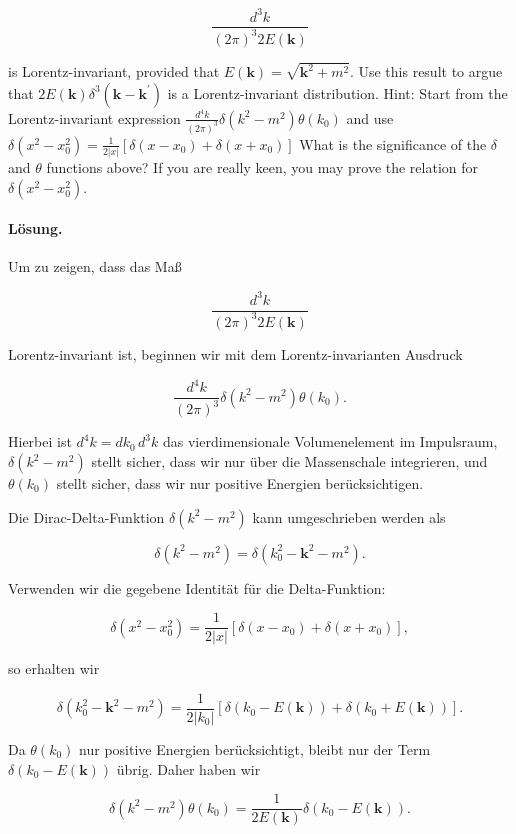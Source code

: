 \documentclass[11pt,a4paper]{article}
\begin{document}
$$
\frac{d^3 k}{(2 \pi)^3 2 E(\mathbf{k})}
$$

is Lorentz-invariant, provided that $E(\mathbf{k})=\sqrt{\mathbf{k}^2+m^2}$. Use this result to argue that $2 E(\mathbf{k}) \delta^3\left(\mathbf{k}-\mathbf{k}^{\prime}\right)$ is a Lorentz-invariant distribution.
Hint: Start from the Lorentz-invariant expression $\frac{d^4 k}{(2 \pi)^3} \delta\left(k^2-m^2\right) \theta\left(k_0\right)$ and use $\delta\left(x^2-x_0^2\right)=\frac{1}{2|x|}\left[\delta\left(x-x_0\right)+\delta\left(x+x_0\right)\right]$ What is the significance of the $\delta$ and $\theta$ functions above? If you are really keen, you may prove the relation for $\delta\left(x^2-x_0^2\right)$.

\paragraph{Lösung.}
Um zu zeigen, dass das Maß 

\[
\frac{d^3 k}{(2 \pi)^3 2 E(\mathbf{k})}
\]

Lorentz-invariant ist, beginnen wir mit dem Lorentz-invarianten Ausdruck 

\[
\frac{d^4 k}{(2 \pi)^3} \delta\left(k^2 - m^2\right) \theta\left(k_0\right).
\]

Hierbei ist $d^4 k = dk_0 \, d^3 k$ das vierdimensionale Volumenelement im Impulsraum, $\delta\left(k^2 - m^2\right)$ stellt sicher, dass wir nur über die Massenschale integrieren, und $\theta\left(k_0\right)$ stellt sicher, dass wir nur positive Energien berücksichtigen.

Die Dirac-Delta-Funktion $\delta\left(k^2 - m^2\right)$ kann umgeschrieben werden als 

\[
\delta\left(k^2 - m^2\right) = \delta\left(k_0^2 - \mathbf{k}^2 - m^2\right).
\]

Verwenden wir die gegebene Identität für die Delta-Funktion:

\[
\delta\left(x^2 - x_0^2\right) = \frac{1}{2|x|}\left[\delta\left(x - x_0\right) + \delta\left(x + x_0\right)\right],
\]

so erhalten wir

\[
\delta\left(k_0^2 - \mathbf{k}^2 - m^2\right) = \frac{1}{2|k_0|} \left[\delta\left(k_0 - E(\mathbf{k})\right) + \delta\left(k_0 + E(\mathbf{k})\right)\right].
\]

Da $\theta(k_0)$ nur positive Energien berücksichtigt, bleibt nur der Term $\delta\left(k_0 - E(\mathbf{k})\right)$ übrig. Daher haben wir

\[
\delta\left(k^2 - m^2\right) \theta\left(k_0\right) = \frac{1}{2E(\mathbf{k})} \delta\left(k_0 - E(\mathbf{k})\right).
\]
\end{document}
